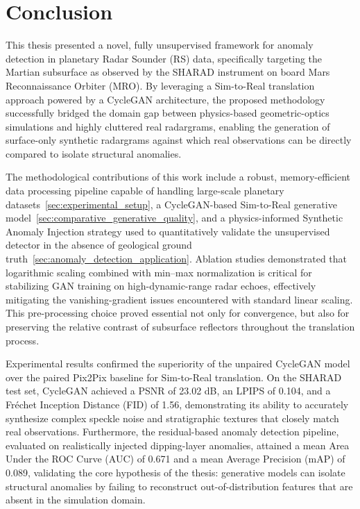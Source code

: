 \chapter{Conclusion}
\label{cha:conclusion}
This thesis presented a novel, fully unsupervised framework for anomaly detection in planetary Radar Sounder (RS) data, specifically targeting the Martian subsurface as observed by the SHARAD instrument on board Mars Reconnaissance Orbiter (MRO).
By leveraging a Sim-to-Real translation approach powered by a CycleGAN architecture, the proposed methodology successfully bridged the domain gap between physics-based geometric-optics simulations and highly cluttered real radargrams, enabling the generation of surface-only synthetic radargrams against which real observations can be directly compared to isolate structural anomalies.

The methodological contributions of this work include a robust, memory-efficient data processing pipeline capable of handling large-scale planetary datasets~\ref{sec:experimental_setup}, a CycleGAN-based Sim-to-Real generative model~\ref{sec:comparative_generative_quality}, and a physics-informed Synthetic Anomaly Injection strategy used to quantitatively validate the unsupervised detector in the absence of geological ground truth~\ref{sec:anomaly_detection_application}.
Ablation studies demonstrated that logarithmic scaling combined with min–max normalization is critical for stabilizing GAN training on high-dynamic-range radar echoes, effectively mitigating the vanishing-gradient issues encountered with standard linear scaling.
This pre-processing choice proved essential not only for convergence, but also for preserving the relative contrast of subsurface reflectors throughout the translation process.

Experimental results confirmed the superiority of the unpaired CycleGAN model over the paired Pix2Pix baseline for Sim-to-Real translation.
On the SHARAD test set, CycleGAN achieved a PSNR of 23.02 dB, an LPIPS of 0.104, and a Fréchet Inception Distance (FID) of 1.56, demonstrating its ability to accurately synthesize complex speckle noise and stratigraphic textures that closely match real observations.
Furthermore, the residual-based anomaly detection pipeline, evaluated on realistically injected dipping-layer anomalies, attained a mean Area Under the ROC Curve (AUC) of 0.671 and a mean Average Precision (mAP) of 0.089, validating the core hypothesis of the thesis: generative models can isolate structural anomalies by failing to reconstruct out-of-distribution features that are absent in the simulation domain.

